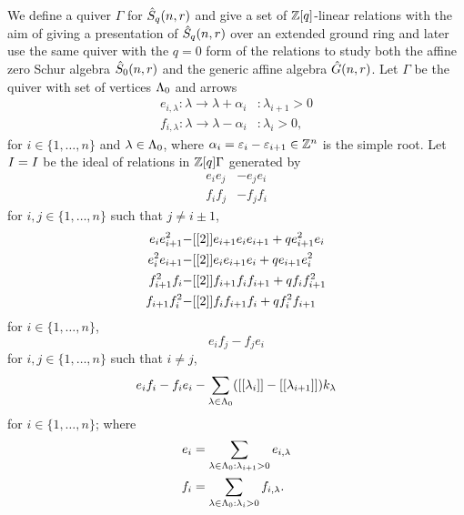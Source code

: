 \documentclass[a4paper, 11pt]{report}
\begin{document}
We define a quiver $\Gamma$ for $\hat{S}_q(n,r)$ and give a set of $\mathbb{Z}[q]$-linear relations with the aim of giving a presentation of $\hat{S}_q(n,r)$ over an extended ground ring and later use the same quiver with the $q=0$ form of the relations to study both the affine zero Schur algebra $\hat{S}_0(n,r)$ and the generic affine algebra $\hat{G}(n,r)$. Let $\Gamma$ be the quiver with set of vertices $\Lambda_0{}$ and arrows
\begin{align*}
e_{i,\lambda}\colon\lambda\to \lambda +\alpha_i &: \lambda_{i+1} > 0\\
f_{i,\lambda}\colon\lambda\to\lambda -\alpha_i &: \lambda_i > 0,
\end{align*}
for $i\in\{1,\ldots,n\}$ and $\lambda\in\Lambda_0{}$, where $\alpha_i=\varepsilon_i - \varepsilon_{i+1}\in\mathbb{Z}^n$ is the simple root. Let $I=I$ be the ideal of relations in $\mathbb{Z}[q]\Gamma$ generated by
\begin{align*}
e_ie_j &-e_je_i\\
f_if_j &-f_jf_i
\end{align*}
for $i,j\in\{1,\ldots,n\}$ such that $j\neq i\pm 1$,
\begin{align*}
e_ie_{i+1}^2 -&[[2]]e_{i+1}e_ie_{i+1} +qe_{i+1}^2e_i\\
e_i^2e_{i+1} -&[[2]]e_ie_{i+1}e_i +qe_{i+1}e_i^2\\
f_{i+1}^2f_i -&[[2]]f_{i+1}f_if_{i+1} +qf_if_{i+1}^2\\
f_{i+1}f_i^2 -&[[2]]f_if_{i+1}f_i +qf_i^2f_{i+1}
\end{align*}
for $i\in\{1,\ldots,n\}$,
\begin{equation*}
e_if_j-f_je_i
\end{equation*}
for $i,j\in\{1,\ldots,n\}$ such that $i\neq j$,
\begin{equation*}
e_if_i-f_ie_i - \sum_{\lambda\in\Lambda_0{}}([[\lambda_i]]-[[\lambda_{i+1}]])k_\lambda
\end{equation*}
for $i\in\{1,\ldots,n\}$;
where
\begin{align*}
e_i &= \sum_{\lambda\in\Lambda_0{}:\lambda_{i+1}>0} e_{i,\lambda}\\
f_i &= \sum_{\lambda\in\Lambda_0{}:\lambda_i>0} f_{i,\lambda}.
\end{align*}
\end{document}
